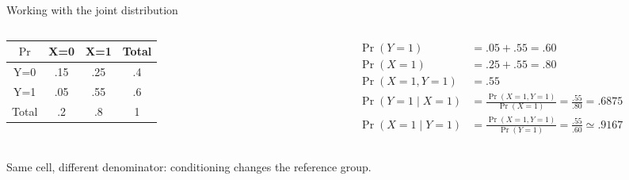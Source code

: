 \documentclass[notes,10pt, aspectratio=169]{beamer}
\begin{document}
\begin{frame}{Working with the joint distribution}
\small
\begin{columns}[T]
\begin{column}{0.43\textwidth}
\begin{center}
\begin{tabular}{|c|c|c|c|}
\hline
$\Pr$    & X=0 & X=1 & Total \\ \hline
Y=0   & .15 & .25 & .4    \\ \hline
Y=1   & .05 & .55 & .6    \\ \hline
Total & .2  & .8  & 1     \\ \hline
\end{tabular}
\end{center}
\end{column}
\begin{column}{0.55\textwidth}
\begin{align*}
\Pr(Y=1)&=.05+.55=.60\\
\Pr(X=1)&=.25+.55=.80\\
\Pr(X=1,Y=1)&=.55\\
\Pr(Y=1\mid X=1)&=\frac{\Pr(X=1,Y=1)}{\Pr(X=1)}
                 =\frac{.55}{.80}=.6875\\
\Pr(X=1\mid Y=1)&=\frac{\Pr(X=1,Y=1)}{\Pr(Y=1)}
                 =\frac{.55}{.60}\simeq .9167
\end{align*}
\end{column}
\end{columns}
\vspace{.15cm}
Same cell, different denominator: conditioning changes the reference group.
\end{frame}
\end{document}
